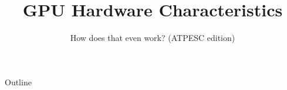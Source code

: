 \documentclass[aspectratio=169]{beamer}
\title{GPU Hardware Characteristics}
\subtitle{How does that even work? (ATPESC edition)}
\begin{document}
\maketitle

\begin{frame}{Outline}
\tableofcontents[hideallsubsections]
\end{frame}




\end{document}
